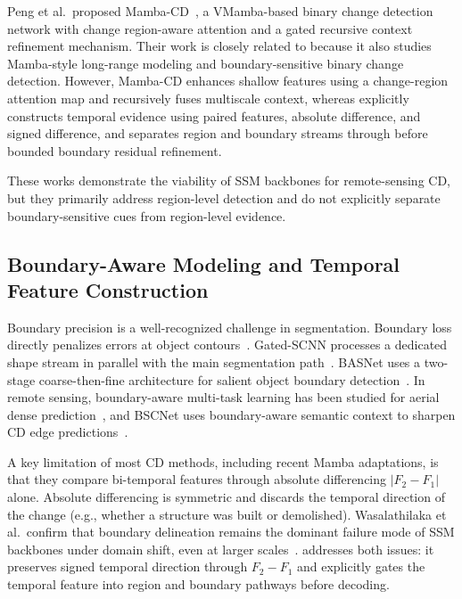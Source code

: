 Peng et al.\ proposed Mamba-CD~\cite{peng2026mambacd}, a VMamba-based binary change detection network with change region-aware attention and a gated recursive context refinement mechanism. Their work is closely related to \ours{} because it also studies Mamba-style long-range modeling and boundary-sensitive binary change detection. However, Mamba-CD enhances shallow features using a change-region attention map and recursively fuses multiscale context, whereas \ours{} explicitly constructs temporal evidence using paired features, absolute difference, and signed difference, and separates region and boundary streams through \drbi{} before bounded boundary residual refinement.

These works demonstrate the viability of SSM backbones for remote-sensing CD, but they primarily address region-level detection and do not explicitly separate boundary-sensitive cues from region-level evidence.

\subsection{Boundary-Aware Modeling and Temporal Feature Construction}
Boundary precision is a well-recognized challenge in segmentation. Boundary loss directly penalizes errors at object contours~\cite{kervadec2019boundary}. Gated-SCNN processes a dedicated shape stream in parallel with the main segmentation path~\cite{takikawa2019gated}. BASNet uses a two-stage coarse-then-fine architecture for salient object boundary detection~\cite{qin2019basnet}. In remote sensing, boundary-aware multi-task learning has been studied for aerial dense prediction~\cite{wang2021boundary}, and BSCNet uses boundary-aware semantic context to sharpen CD edge predictions~\cite{zhou2026bscnet}.

A key limitation of most CD methods, including recent Mamba adaptations, is that they compare bi-temporal features through absolute differencing $|F_2 - F_1|$ alone. Absolute differencing is symmetric and discards the temporal direction of the change (e.g., whether a structure was built or demolished). Wasalathilaka et al.\ confirm that boundary delineation remains the dominant failure mode of SSM backbones under domain shift, even at larger scales~\cite{wasalathilaka2026controlled}. \ours{} addresses both issues: it preserves signed temporal direction through $F_2 - F_1$ and explicitly gates the temporal feature into region and boundary pathways before decoding.
